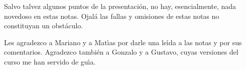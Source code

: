 Salvo talvez algunos puntos de la presentaci\'on, no hay, esencialmente,
nada novedoso en estas notas. Ojal\'a las fallas y omisiones de estas notas
no constituyan un obst\'aculo.

Les agradezco a Mariano y a Mat\'{\i}as por darle una le\'{\i}da a las
notas y por sus comentarios. Agradezco tambi\'en a Gonzalo y a Gustavo,
cuyas versiones del curso me han servido de gu\'{\i}a.
